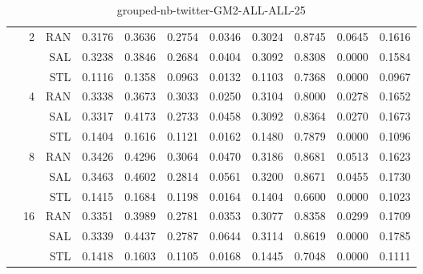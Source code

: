 \begin{center}
\begin{table}[htbp]
\begin{tabular}{ | r | r | r | r | r | r | r | r | r | r | r |}
 & \multirow{3}{*}{2} & RAN & 0.3176 & 0.3636 & 0.2754 & 0.0346 & 0.3024 & 0.8745 & 0.0645 & 0.1616\\ \cline{3-11}
 &   & SAL & 0.3238 & 0.3846 & 0.2684 & 0.0404 & 0.3092 & 0.8308 & 0.0000 & 0.1584\\ \cline{3-11}
 &   & STL & 0.1116 & 0.1358 & 0.0963 & 0.0132 & 0.1103 & 0.7368 & 0.0000 & 0.0967\\ \cline{2-11}
 & \multirow{3}{*}{4} & RAN & 0.3338 & 0.3673 & 0.3033 & 0.0250 & 0.3104 & 0.8000 & 0.0278 & 0.1652\\ \cline{3-11}
 &   & SAL & 0.3317 & 0.4173 & 0.2733 & 0.0458 & 0.3092 & 0.8364 & 0.0270 & 0.1673\\ \cline{3-11}
 &   & STL & 0.1404 & 0.1616 & 0.1121 & 0.0162 & 0.1480 & 0.7879 & 0.0000 & 0.1096\\ \cline{2-11}
 & \multirow{3}{*}{8} & RAN & 0.3426 & 0.4296 & 0.3064 & 0.0470 & 0.3186 & 0.8681 & 0.0513 & 0.1623\\ \cline{3-11}
 &   & SAL & 0.3463 & 0.4602 & 0.2814 & 0.0561 & 0.3200 & 0.8671 & 0.0455 & 0.1730\\ \cline{3-11}
 &   & STL & 0.1415 & 0.1684 & 0.1198 & 0.0164 & 0.1404 & 0.6600 & 0.0000 & 0.1023\\ \cline{2-11}
 & \multirow{3}{*}{16} & RAN & 0.3351 & 0.3989 & 0.2781 & 0.0353 & 0.3077 & 0.8358 & 0.0299 & 0.1709\\ \cline{3-11}
 &   & SAL & 0.3339 & 0.4437 & 0.2787 & 0.0644 & 0.3114 & 0.8619 & 0.0000 & 0.1785\\ \cline{3-11}
 &   & STL & 0.1418 & 0.1603 & 0.1105 & 0.0168 & 0.1445 & 0.7048 & 0.0000 & 0.1111\\ \cline{2-11}
\hline
\end{tabular}
\caption{grouped-nb-twitter-GM2-ALL-ALL-25}
\end{table}
\end{center}

